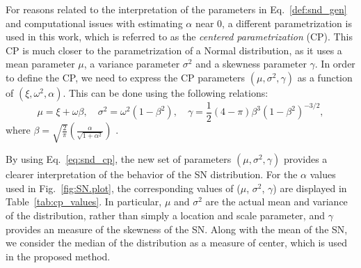 \documentclass[11pt, oneside]{article}
\begin{document}
%
For reasons related to the interpretation of the parameters in Eq.~\ref{def:snd_gen} and computational issues with estimating $\alpha$ near 0, a different parametrization is used in this work, which is referred to as the \emph{centered parametrization} (CP).  This CP is much closer to the parametrization of a Normal distribution, as it uses a mean parameter $\mu$, a variance parameter $\sigma^2$ and a skewness parameter $\gamma$. In order to define the CP, we need to express the CP parameters $(\mu, \sigma^2, \gamma)$ as a function of $(\xi, \omega^2, \alpha)$. This can be done using the following relations:
%
\begin{equation} \label{eq:snd_cp}
\mu = \xi + \omega \beta, \quad \sigma^{2} = \omega^{2}(1-\beta^2), \quad \gamma = \frac{1}{2}(4-\pi) \beta^{3}\left(1-\beta^2\right)^{-3/2},
\end{equation}
%
where $\beta = \sqrt{\frac{2}{\pi}}\left(\frac{\alpha}{\sqrt{1+\alpha^2}}\right)$ \citep[e.g.][]{Arellano-2010}.

By using Eq.~\ref{eq:snd_cp}, the new set of parameters $(\mu, \sigma^2, \gamma)$ provides a clearer interpretation of the behavior of the SN distribution. For the $\alpha$ values used in Fig.~\ref{fig:SN.plot}, the corresponding values of ($\mu$, $\sigma^2$, $\gamma$) are displayed in Table~\ref{tab:cp_values}.  In particular, $\mu$ and $\sigma^2$ are the actual mean and variance of the distribution, rather than simply a location and scale parameter, and $\gamma$ provides an measure of the skewness of the SN. 
Along with the mean of the SN, we consider the median of the distribution as a measure of center, which is used in the proposed method. 
%
\end{document}
